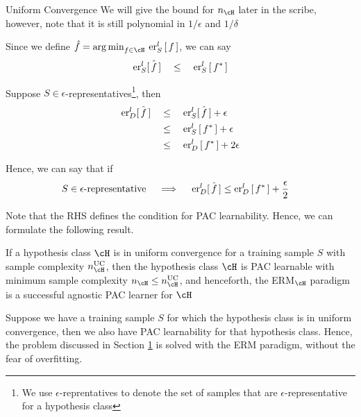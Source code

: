 \documentclass{article}
\begin{document}
\begin{ssection}[3]{Uniform Convergence}
	We will give the bound for $n_\cH$ later in the scribe, however, note that it is still polynomial in $1 / \epsilon$ and $1 / \delta$

	Since we define $\hat{f} = \argmin{f \in \cH} \err[_S^l]{f}$, we can say
	\begin{align*}
		\errs[_S^l]{f}	\qle	\err[_S^l]{f^\ast}
	\end{align*} \sbr

	Suppose $S \in \epsilon$-representatives\footnote{We use $\epsilon$-reprentatives to denote the set of samples that are $\epsilon$-representative for a hypothesis class}, then
	\begin{align*}
		\errs[_D^l]{f}	&\qle	\errs[_S^l]{f} + \epsilon \\
						&\qle	\err[_S^l]{f^\ast} + \epsilon \\
						&\qle	\err[_D^l]{f^\ast} + 2 \epsilon \\
	\end{align*} \sbr

	Hence, we can say that if
	\begin{align*}
		S \in \epsilon\text{-representative}	&\qimplies	\errs[_D^l]{f} \le	\err[_D^l]{f^\ast} + \frac{\epsilon}{2}
	\end{align*} \sbr

	Note that the RHS defines the condition for PAC learnability. Hence, we can formulate the following result.

	\begin{result}
		If a hypothesis class $\cH$ is in uniform convergence for a training sample $S$ with sample complexity $n_\cH^{\text{UC}}$, then the hypothesis class $\cH$ is PAC learnable with minimum sample complexity $n_\cH \le n_\cH^{\text{UC}}$, and henceforth, the ERM$_\cH$ paradigm is a successful agnostic PAC learner for $\cH$
		\label{res:unif-pac}
	\end{result}

	Suppose we have a training sample $S$ for which the hypothesis class is in uniform convergence, then we also have PAC learnability for that hypothesis class. Hence, the problem discussed in Section \hyperlink{sec:1}{1} is solved with the ERM paradigm, without the fear of overfitting. \br

\end{ssection}
\end{document}
